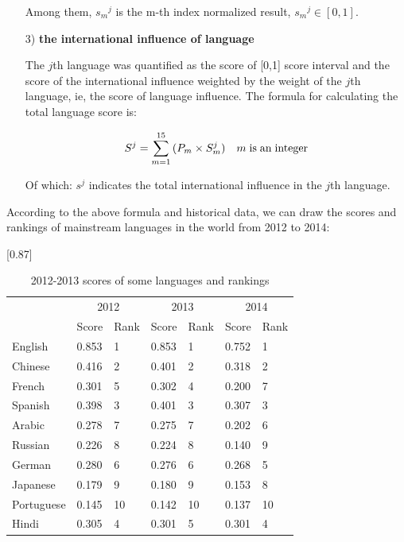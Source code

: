 \begin{enumerate}
	\par Among them, ${s_m}^j$ is the m-th index normalized result, ${s_m}^j \in [0,1]$.
	
	\item[3)] \textbf{the international influence of language}
	\par The $j$th language was quantified as the score of [0,1] score interval and the score  of the international influence weighted by the weight of the $j$th language, ie, the score of language influence. The formula for calculating the total language score is:
	 
	 \begin{equation}
	 {S^j} = \sum\limits_{m = 1}^{15} {({P_m} \times S_m^j)} {\rm{       }}\quad m\;{\rm{ is\; an\; integer}} \label{aa1}
	 \end{equation}
	 \par Of which: ${s^j}$ indicates the total international influence in the $j$th language.
	
\end{enumerate}

\par According to the above formula and historical data, we can draw the scores and rankings of mainstream languages in the world from 2012 to 2014:


\begin{table}[H]
	\centering
	\caption{2012-2013 scores of some languages and rankings}
	 \scalebox{0.87}[0.87]{%
	\begin{tabular}{p{4.11em}p{4.11em}p{4.11em}p{4.11em}p{4.11em}p{4.11em}p{4.11em}}
		\toprule
		\multicolumn{1}{r}{\multirow{2}[4]{*}{\backslashbox[0pt][c]{Language}{Time}}} & \multicolumn{2}{c}{2012} & \multicolumn{2}{c}{2013} & \multicolumn{2}{c}{2014} \\
		\cmidrule{2-7}    \multicolumn{1}{c}{} & Score & Rank & Score& Rank & Score & Rank\\
    \midrule
	English & 0.853  & 1     & 0.853  & 1     & 0.752  & 1 \\
	\midrule
	Chinese & 0.416  & 2     & 0.401  & 2     & 0.318  & 2 \\
	\midrule
	French & 0.301  & 5     & 0.302  & 4     & 0.200  & 7 \\
	\midrule
	Spanish & 0.398  & 3     & 0.401  & 3     & 0.307  & 3 \\
	\midrule
	Arabic & 0.278  & 7     & 0.275  & 7     & 0.202  & 6 \\
	\midrule
	Russian & 0.226  & 8     & 0.224  & 8     & 0.140  & 9 \\
	\midrule
	German & 0.280  & 6     & 0.276  & 6     & 0.268  & 5 \\
	\midrule
	Japanese & 0.179  & 9     & 0.180  & 9     & 0.153  & 8 \\
	\midrule
	Portuguese & 0.145  & 10    & 0.142  & 10    & 0.137  & 10 \\
	\midrule
	Hindi & 0.305  & 4     & 0.301  & 5     & 0.301  & 4 \\
	\bottomrule
	\end{tabular}%
}
	\label{tab:012}%
\end{table}%

